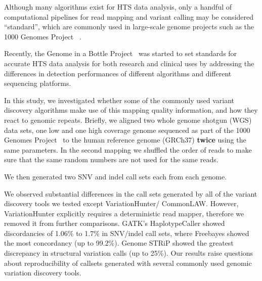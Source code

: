 \documentclass{bioinfo}
\newcommand{\junk}[1]{}
\begin{document}
Although many algorithms exist for HTS data analysis, only a handful of computational pipelines for read mapping and variant calling may be considered ``standard'', which are commonly used in large-scale genome projects such as the 1000 Genomes Project ~\citep{1000GP2015}. 
\junk {For example, to discover and genotype variants using Illumina data, first the reads are mapped to reference genome assembly using BWA-MEM~\citep{Li2013}, Bowtie~\citep{Langmead2009}, or a similar tool~\citep{Alkan2009,Weese2012} then the alignment files are processed using SAMtools~\citep{Li2009b} and Picard\footnote{\href{http://broadinstitute.github.io/picard/}{http://broadinstitute.github.io/picard/}}, and finally the single nucleotide variants (SNV) and indels are predicted and filtered using GATK~\citep{DePristo2011}, Platypus~\citep{Rimmer2014}, or Freebayes~\citep{Garrison2012}. 
Structural variation (SV) discovery is even more challenging as exemplified by the 1000 Genomes Project~\citep{1000GP2015,Mills2011}, where more than 20 algorithms were used to characterize SVs.
} 
Recently, the Genome in a Bottle Project~\citep{Zook2014} was started to set standards for accurate HTS data analysis for both research and clinical uses by addressing the differences in detection performances 
of different algorithms and different sequencing platforms.

In this study, we investigated whether some of the commonly used variant discovery algorithms
make use of this mapping quality information, and how they react to genomic repeats.
Briefly, 
we aligned two whole genome shotgun (WGS) data sets, one low and one high coverage genome
sequenced as part of the 1000 Genomes Project~\citep{1000GP2015} to the human reference genome (GRCh37) {\bf twice} using the same parameters. 
In the second mapping 
we shuffled the order of reads  to make sure that the same random numbers are not used for the same reads. 
\junk{ In a small scale test, we did not observe any differences
in the alignment files when we used deterministic aligners such as Bowtie~\citep{Langmead2009} and mrFAST~\citep{Alkan2009};
however, 
the map locations reported by BWA-MEM in repetitive regions differed among replications ($\sim$2.1\% of reads) as expected due to its random placement strategy.}
We then generated two SNV and indel call sets each from each genome.

We observed substantial differences in the call sets generated by all of the variant discovery tools we tested except VariationHunter/ CommonLAW. However, VariationHunter explicitly requires
 a deterministic read mapper, therefore we removed it from further comparisons. GATK's HaplotypeCaller showed discordancies of 1.06\% to 1.7\% in SNV/indel call sets,
 where Freebayes showed the most concordancy (up to 99.2\%). Genome STRiP showed the greatest discrepancy in structural variation calls (up to 25\%).
Our results raise questions about reproducibility of callsets generated with several commonly used genomic variation discovery tools.
\end{document}
